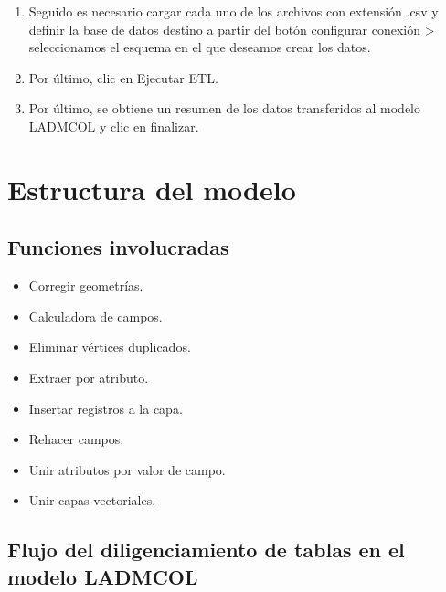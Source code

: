 \documentclass[letterpaper,10pt,spanish]{sphinxmanual}
\begin{document}
\begin{enumerate}
\item {} 
Seguido es necesario cargar cada uno de los archivos con extensión .csv y definir la base de datos destino a partir del botón configurar conexión \sphinxhyphen{}\textgreater{} seleccionamos el esquema en el que deseamos crear los datos.

\item {} 
Por último, clic en Ejecutar ETL.


\item {} 
Por último, se obtiene un resumen de los datos transferidos al modelo LADM\sphinxhyphen{}COL y clic en finalizar.


\end{enumerate}


\section{Estructura del modelo}
\label{\detokenize{ETL_SNC/Model:estructura-del-modelo}}\label{\detokenize{ETL_SNC/Model::doc}}

\subsection{Funciones involucradas}
\label{\detokenize{ETL_SNC/Model:funciones-involucradas}}\begin{itemize}
\item {} 
Corregir geometrías.

\item {} 
Calculadora de campos.

\item {} 
Eliminar vértices duplicados.

\item {} 
Extraer por atributo.

\item {} 
Insertar registros a la capa.

\item {} 
Rehacer campos.

\item {} 
Unir atributos por valor de campo.

\item {} 
Unir capas vectoriales.

\end{itemize}


\subsection{Flujo del diligenciamiento de tablas en el modelo LADM\sphinxhyphen{}COL}
\label{\detokenize{ETL_SNC/Model:flujo-del-diligenciamiento-de-tablas-en-el-modelo-ladm-col}}
\end{document}
